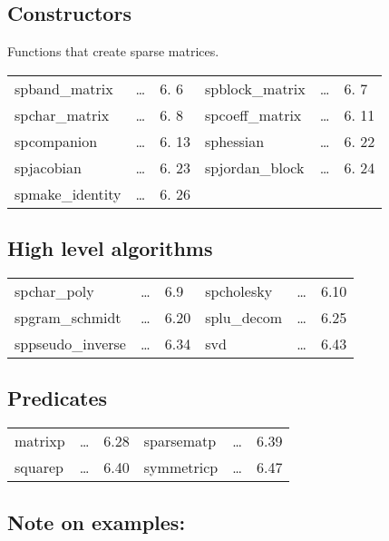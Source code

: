 \subsection{Constructors}

Functions that create sparse matrices.

\begin{center}
\begin{tabular}{l l l l l l}
spband\_matrix       & \ldots & 6. 6 & 
spblock\_matrix      & \ldots & 6. 7 \\
spchar\_matrix       & \ldots & 6. 8 & 
spcoeff\_matrix      & \ldots & 6. 11 \\ 
spcompanion          & \ldots & 6. 13 & 
sphessian            & \ldots & 6. 22 \\
spjacobian           & \ldots & 6. 23 &
spjordan\_block      & \ldots & 6. 24 \\ 
spmake\_identity     & \ldots & 6. 26 &
\end{tabular}
\end{center}

\subsection{High level algorithms}

\begin{center}
\begin{tabular}{l l l l l l}
spchar\_poly       & \ldots & 6.9 & 
spcholesky         & \ldots & 6.10 \\ 
spgram\_schmidt    & \ldots & 6.20 & 
splu\_decom        & \ldots & 6.25 \\
sppseudo\_inverse  & \ldots & 6.34 & 
svd                & \ldots & 6.43 
\end{tabular}
\end{center}

\subsection{Predicates}

\begin{center}
\begin{tabular}{l l l l l l}
matrixp     & \ldots & 6.28 & 
sparsematp  & \ldots & 6.39 \\
squarep     & \ldots & 6.40 &
symmetricp  & \ldots & 6.47 
\end{tabular}
\end{center}

\subsection*{Note on examples:} 

